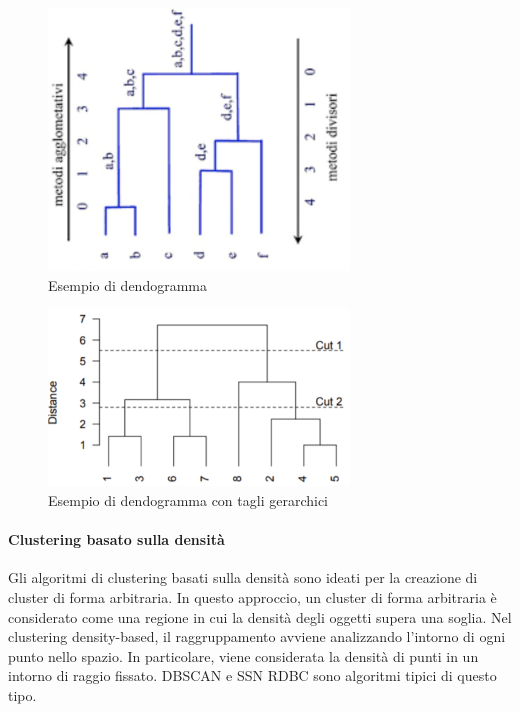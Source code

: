 \documentclass[12pt, a4paper, italian]{report}
\numberwithin{figure}{chapter}
\numberwithin{table}{chapter}
\begin{document}
\begin{figure}[h] \centering
\includegraphics[width=8cm]{C_Gerarchico1.png}
\caption{Esempio di dendogramma\protect\footnotemark}
\label{fig:esempio di clustering gerarchico}
\end{figure}

\vspace{1cm}

\begin{figure}[h] \centering
\includegraphics[width=8cm]{C_Gerarchico2.png}
\caption{Esempio di dendogramma con tagli gerarchici\protect\footnotemark}
\label{fig:esempio dendogramma}
\end{figure}

\paragraph{Clustering basato sulla densità}
Gli algoritmi di clustering basati sulla densità sono ideati per la creazione di cluster di forma arbitraria. In questo approccio, un cluster di forma arbitraria è considerato come una regione in cui la densità degli oggetti supera una soglia. Nel clustering density-based, il raggruppamento avviene analizzando l'intorno di ogni punto nello spazio. In particolare, viene considerata la densità di punti in un intorno di raggio fissato. DBSCAN e SSN RDBC sono algoritmi tipici di questo tipo.
\end{document}
